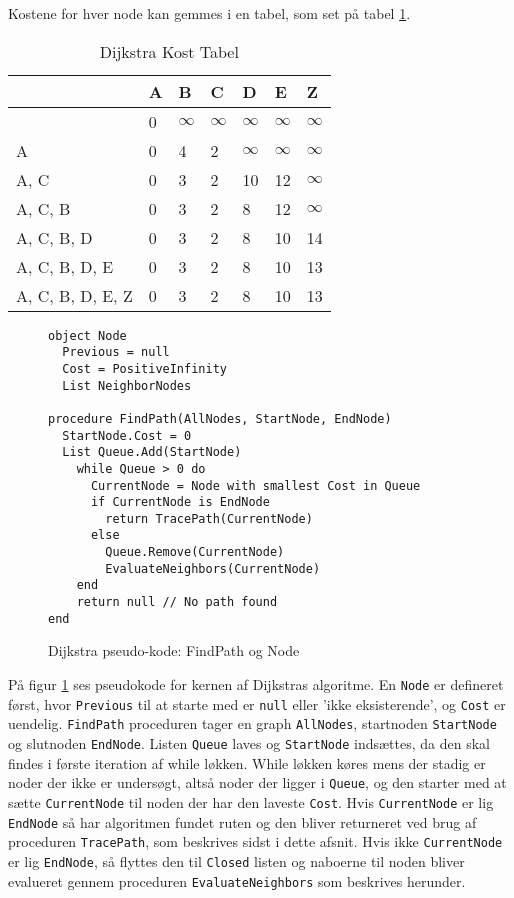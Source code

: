 Kostene for hver node kan gemmes i en tabel, som set på tabel \ref{dijktabel}.
  
\begin{table}[H]
\centering
  \begin{tabular}{|l|l|l|l|l|l|l|}
  \hline
                   & A & B & C & D  & E  & Z  \\ \hline
                   & 0 & $\infty$ & $\infty$ & $\infty$  & $\infty$  & $\infty$  \\ \hline
  A                & 0 & 4 & 2 & $\infty$  & $\infty$  & $\infty$  \\ \hline
  A, C             & 0 & 3 & 2 & 10 & 12 & $\infty$  \\ \hline
  A, C, B          & 0 & 3 & 2 & 8  & 12 & $\infty$  \\ \hline
  A, C, B, D       & 0 & 3 & 2 & 8  & 10 & 14 \\ \hline
  A, C, B, D, E    & 0 & 3 & 2 & 8  & 10 & 13 \\ \hline
  A, C, B, D, E, Z & 0 & 3 & 2 & 8  & 10 & 13 \\ \hline
  \end{tabular}
\caption{Dijkstra Kost Tabel} \label{dijktabel}
\end{table}

\begin{figure}[H]
\begin{lstlisting}
object Node
  Previous = null
  Cost = PositiveInfinity
  List NeighborNodes

procedure FindPath(AllNodes, StartNode, EndNode)
  StartNode.Cost = 0
  List Queue.Add(StartNode)
    while Queue > 0 do
      CurrentNode = Node with smallest Cost in Queue
      if CurrentNode is EndNode
        return TracePath(CurrentNode)
      else
        Queue.Remove(CurrentNode)
        EvaluateNeighbors(CurrentNode)
    end
    return null // No path found
end
\end{lstlisting}
\caption{Dijkstra pseudo-kode: FindPath og Node}\label{DijkstraCodeFindPathNode}
\end{figure}

På figur \ref{DijkstraCodeFindPathNode} ses pseudokode for kernen af Dijkstras algoritme. En \texttt{Node} er defineret først, hvor \texttt{Previous} til at starte med er \texttt{null} eller 'ikke eksisterende', og \texttt{Cost} er uendelig. \texttt{FindPath} proceduren tager en graph \texttt{AllNodes}, startnoden \texttt{StartNode} og slutnoden \texttt{EndNode}. Listen \texttt{Queue} laves og \texttt{StartNode} indsættes, da den skal findes i første iteration af while løkken. While løkken køres mens der stadig er noder der ikke er undersøgt, altså noder der ligger i \texttt{Queue}, og den starter med at sætte \texttt{CurrentNode} til noden der har den laveste \texttt{Cost}. Hvis \texttt{CurrentNode} er lig \texttt{EndNode} så har algoritmen fundet ruten og den bliver returneret ved brug af proceduren \texttt{TracePath}, som beskrives sidst i dette afsnit. Hvis ikke \texttt{CurrentNode} er lig \texttt{EndNode}, så flyttes den til \texttt{Closed} listen og naboerne til noden bliver evalueret gennem proceduren \texttt{EvaluateNeighbors} som beskrives herunder.

